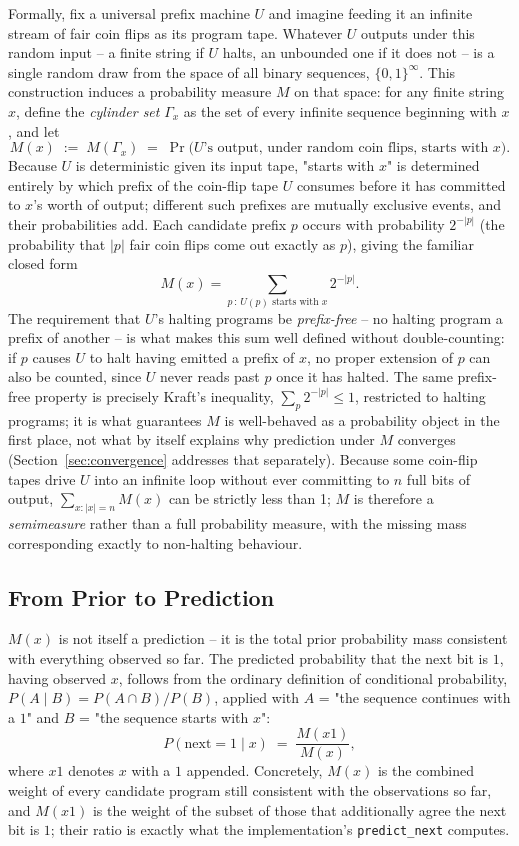 \documentclass[11pt]{article}
\begin{document}
Formally, fix a universal prefix machine $U$ and imagine feeding it an infinite stream of
fair coin flips as its program tape. Whatever $U$ outputs under this random input -- a
finite string if $U$ halts, an unbounded one if it does not -- is a single random draw
from the space of all binary sequences, $\{0,1\}^\infty$. This construction induces a
probability measure $M$ on that space: for any finite string $x$, define the
\emph{cylinder set} $\Gamma_x$ as the set of every infinite sequence beginning with $x$,
and let
\[
  M(x) \;:=\; M(\Gamma_x) \;=\; \Pr\big(U\text{'s output, under random coin flips, starts with } x\big).
\]
Because $U$ is deterministic given its input tape, "starts with $x$" is determined
entirely by which prefix of the coin-flip tape $U$ consumes before it has committed to
$x$'s worth of output; different such prefixes are mutually exclusive events, and their
probabilities add. Each candidate prefix $p$ occurs with probability $2^{-|p|}$ (the
probability that $|p|$ fair coin flips come out exactly as $p$), giving the familiar
closed form
\[
  M(x) = \sum_{p \,:\, U(p) \text{ starts with } x} 2^{-|p|}.
\]
The requirement that $U$'s halting programs be \emph{prefix-free} -- no halting program a
prefix of another -- is what makes this sum well defined without double-counting: if $p$
causes $U$ to halt having emitted a prefix of $x$, no proper extension of $p$ can also be
counted, since $U$ never reads past $p$ once it has halted. The same prefix-free property
is precisely Kraft's inequality, $\sum_p 2^{-|p|} \le 1$, restricted to halting programs;
it is what guarantees $M$ is well-behaved as a probability object in the first place, not
what by itself explains why prediction under $M$ converges (Section~\ref{sec:convergence}
addresses that separately). Because some coin-flip tapes drive $U$ into an infinite loop
without ever committing to $n$ full bits of output, $\sum_{x : |x|=n} M(x)$ can be
strictly less than 1; $M$ is therefore a \emph{semimeasure} rather than a full probability
measure, with the missing mass corresponding exactly to non-halting behaviour.

\subsection{From Prior to Prediction}

$M(x)$ is not itself a prediction -- it is the total prior probability mass consistent
with everything observed so far. The predicted probability that the next bit is $1$,
having observed $x$, follows from the ordinary definition of conditional probability,
$P(A\mid B) = P(A\cap B)/P(B)$, applied with $A$ = "the sequence continues with a $1$" and
$B$ = "the sequence starts with $x$":
\[
  P(\text{next} = 1 \mid x) \;=\; \frac{M(x1)}{M(x)},
\]
where $x1$ denotes $x$ with a $1$ appended. Concretely, $M(x)$ is the combined weight of
every candidate program still consistent with the observations so far, and $M(x1)$ is the
weight of the subset of those that additionally agree the next bit is $1$; their ratio is
exactly what the implementation's \texttt{predict\_next} computes.
\end{document}
